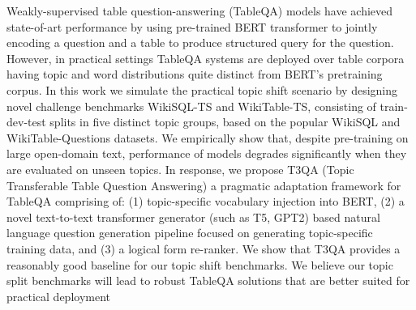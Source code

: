 Weakly-supervised table question-answering (TableQA) models have achieved state-of-art performance by using pre-trained BERT transformer to jointly encoding a question and a table to produce structured query for the question. However, in practical settings TableQA systems are deployed over table corpora having topic and word distributions quite distinct from BERT's pretraining corpus. In this work we simulate the practical topic shift scenario by designing novel challenge benchmarks WikiSQL-TS and WikiTable-TS, consisting of train-dev-test splits in five distinct topic groups, based on the popular WikiSQL and WikiTable-Questions datasets. We empirically show that, despite pre-training on large open-domain text, performance of models degrades significantly when they are evaluated on unseen topics. In response, we propose T3QA (Topic Transferable Table Question Answering) a pragmatic adaptation framework for TableQA comprising of: (1) topic-specific vocabulary injection into BERT, (2) a novel text-to-text transformer generator (such as T5, GPT2) based natural language question generation pipeline focused on generating topic-specific training data, and (3) a logical form re-ranker.  We show that T3QA provides a reasonably good baseline for our topic shift benchmarks. We believe our topic split benchmarks will lead to robust TableQA solutions that are better suited for practical deployment

